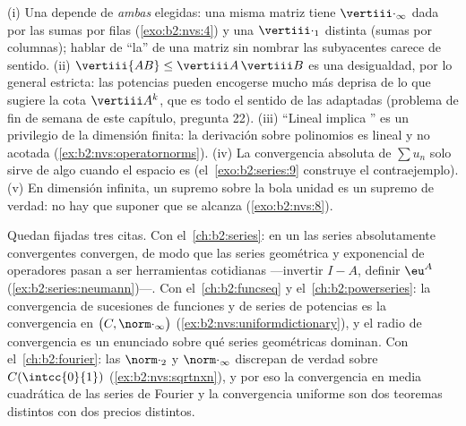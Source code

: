 \begin{remark}\label{rem:b2:nvs:pitfalls}
(i) Una  depende de \emph{ambas} 
elegidas: una misma matriz tiene $\vertiii\cdot_\infty$ dada por
las sumas por filas (\cref{exo:b2:nvs:4}) y una
$\vertiii\cdot_1$ distinta (sumas por columnas); hablar de ``la''
 de una matriz sin nombrar las  subyacentes carece de
sentido. (ii) $\vertiii{AB} \leq \vertiii A\,\vertiii B$ es una
desigualdad, por lo general estricta: las potencias pueden
encogerse mucho más deprisa de lo que sugiere la cota $\vertiii
A^k$, que es todo el sentido de las  adaptadas (problema de
fin de semana de este capítulo, pregunta 22). (iii) ``Lineal
implica '' es un privilegio de la dimensión finita: la
derivación sobre polinomios es lineal y no acotada
(\cref{ex:b2:nvs:operatornorms}). (iv) La convergencia absoluta de
$\sum u_n$ solo sirve de algo cuando el espacio es  (el~\cref{exo:b2:series:9} construye el contraejemplo). (v) En
dimensión infinita, un supremo sobre la bola unidad es un supremo
de verdad: no hay que suponer que se alcanza
(\cref{exo:b2:nvs:8}).
\end{remark}

\begin{remark}\label{rem:b2:nvs:perspectives}
Quedan fijadas tres citas. Con el~\cref{ch:b2:series}: en un
 las series absolutamente convergentes convergen,
de modo que las series geométrica y exponencial de operadores pasan
a ser herramientas cotidianas ---invertir $I - A$, definir
$\eu^{A}$ (\cref{ex:b2:series:neumann})---. Con el~\cref{ch:b2:funcseq} y el~\cref{ch:b2:powerseries}: la convergencia
de sucesiones de funciones y de series de potencias es la
convergencia en $\bigl(C, \norm\cdot_\infty\bigr)$
(\cref{ex:b2:nvs:uniformdictionary}), y el radio de convergencia es
un enunciado sobre qué series geométricas dominan. Con el~\cref{ch:b2:fourier}: las  $\norm\cdot_2$ y
$\norm\cdot_\infty$ discrepan de verdad sobre $C(\intcc{0}{1})$
(\cref{ex:b2:nvs:sqrtnxn}), y por eso la convergencia en media
cuadrática de las series de Fourier y la convergencia uniforme son
dos teoremas distintos con dos precios distintos.
\end{remark}

